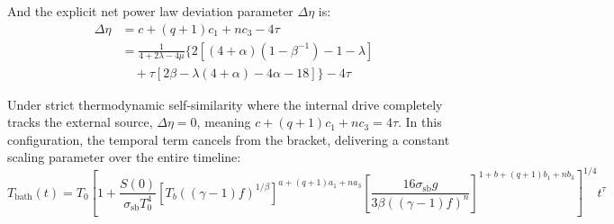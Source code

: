 \documentclass[11pt]{article}
\begin{document}
And the explicit net power law deviation parameter $\Delta \eta$ is:
\begin{align}
    \Delta \eta &= c + (q+1)c_1 + n c_3 - 4\tau \\
    &= \frac{1}{4 + 2\lambda - 4\mu} \Big\{ 2\left[ (4+\alpha)(1 - \beta^{-1}) - 1 - \lambda \right] \nonumber \\
    &\quad + \tau \left[ 2\beta - \lambda(4+\alpha) - 4\alpha - 18 \right] \Big\} - 4\tau
\end{align}

Under strict thermodynamic self-similarity where the internal drive completely tracks the external source, $\Delta \eta = 0$, meaning $c + (q+1)c_1 + n c_3 = 4\tau$. In this configuration, the temporal term cancels from the bracket, delivering a constant scaling parameter over the entire timeline:
\begin{equation}
    T_{\text{bath}}(t) = T_0 \left[ 1 + \frac{S(0)}{\sigma_{\text{sb}} T_0^4} \left[ T_b ((\gamma - 1) f)^{1/\beta} \right]^{a + (q+1)a_1 + n a_3} \left[ \frac{16 \sigma_{\text{sb}} g}{3\beta ((\gamma - 1) f)^n} \right]^{1 + b + (q+1)b_1 + n b_3} \right]^{1/4} t^\tau
\end{equation}    
\end{document}
